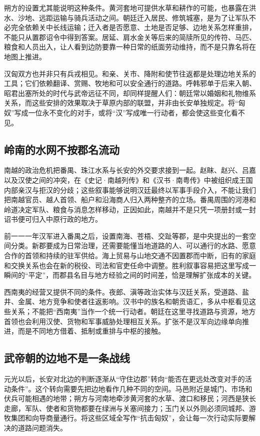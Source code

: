 朔方的设置尤其能说明这种条件。黄河套地可提供水草和耕作的可能，也暴露在洪水、沙地、远距运输与骑兵活动之间。朝廷迁入居民、修筑城塞，是为了让军队不必完全依赖关中长线运输；迁入者是否愿意、土地是否足够、边地关系怎样重排，不能只从置郡诏令中得到答案。居延、肩水金关等后来的简牍所见的传符、马匹、粮食和人员出入，让人看到边防要靠一种日常的纸面劳动维持，而不是只靠名将在地图上推进。

汉匈双方也并非只有兵戎相见。和亲、关市、降附和使节往返都是处理边地关系的工具；它们依赖翻译、赏赐、牧地和可以安全通行的道路。呼韩邪单于后来入朝、昭君出塞所处的时代与武帝远征不同，却同样提醒人们：朝廷常以婚姻和礼物维系关系，而这些安排的效果取决于草原内部的联盟，并非由长安单独规定。将“匈奴”写成一位永不变化的对手，或将“汉”写成唯一行动者，都会使这些变化看不见。

\subsection{岭南的水网不按郡名流动}

南越的政治危机把番禺、珠江水系与长安的外交要求接到一起。赵眜、赵兴、吕嘉以及汉使之间的冲突，在《史记·南越列传》和《汉书·南粤传》中被组织成王国内部亲汉与拒汉的分歧；这些叙事能够说明汉廷最终以军事手段介入，不能让我们把南越官员、越人首领、船户和沿海商人归入两种整齐的立场。番禺周围的河港和岭道决定军队、粮食与消息怎样移动，正因如此，南越并不是只凭一项册封或一封诏书便可归入中原行政的地方。

前一一一年汉军进入番禺之后，设置南海、苍梧、交趾等郡，是中央提出的一套空间分类。新郡要成为日常治理，还需要能懂当地道路的人、可以通行的水路、愿意合作的首领和持续的驻军供给。海上贸易与山地交通不因置郡而中断，旧有的家庭和交换关系也会在新的税役、司法和官吏任命中调整。胜利叙事容易把这里写成一瞬间的“平定”，而郡县名目与地方经验之间的时间差，恰是理解扩张成本的关键。

西南夷的经营又提供不同的条件。夜郎、滇等政治实体与汉廷关系，受道路、盐井、金属、地方竞争和使者往返影响。汉书中的族名和朝贡语汇，多从中枢看见这些关系；不能把“西南夷”当作一个统一行动者。朝廷在这里寻找道路与资源，地方首领也会利用汉使、货物和军事威胁处理相互关系。扩张不是汉军向边缘单向推进，而是不同地方借着、抵制或重排与中枢的接触。

\subsection{武帝朝的边地不是一条战线}

元光以后，长安对北边的判断逐渐从“守住边郡”转向“能否在更远处改变对手的活动条件”。这个转向需要先把边地看作几种不同的空间。马邑附近是城门、市场和伏兵可能相遇的地带；朔方与河南地牵涉黄河套的水草、渡口和移民；河西是狭长走廊，军队、使者和货物都要在绿洲与关塞间接力；玉门关以外则必须同城邦、游牧集团和向导商量通行。将这些区域全写作“抗击匈奴”，会让每一次行动实际要解决的道路问题消失。


